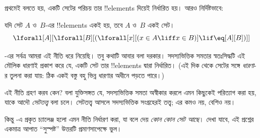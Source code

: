 \documentclass[../../../include/open-logic-section]{subfiles}
\begin{document}

প্রথমেই বলতে হয়, একটি সেটের পরিচয় তার !!{element}s দিয়েই
নির্ধারিত হয়। আরও নির্দিষ্টভাবে:

\begin{axiom}
যদি সেট $A$ ও~$B$-এর !!{element}s একই হয়, তবে $A$ ও~$B$
একই সেট।
\[
  \lforall[A][\lforall[B][(\lforall[x][(x \in A \liff x \in B)] \lif
  \eq[A][B])]]
\]
\end{axiom}

-এর সর্বত্র আমরা এই নীতি ধরে নিয়েছি। তবু
কথাটি আবার বলা দরকার। সদস্যভিত্তিক সমতার স্বতঃসিদ্ধটি এই মৌলিক
ধারণাই প্রকাশ করে যে, একটি সেট তার !!{element}s দ্বারা নির্ধারিত।
(এই দিক থেকে সেটের সঙ্গে \emph{ধারণা}-র তুলনা করা যায়: ঠিক একই
বস্তু বহু ভিন্ন ধারণার অধীনে পড়তে পারে।)

এই নীতি গ্রহণ করব কেন? বলা যুক্তিসঙ্গত যে, সদস্যভিত্তিক সমতা
অস্বীকার করলে এমন কিছুকেই পরিত্যাগ করা হয়, যাকে আদৌ
\emph{সেটতত্ত্ব} বলা চলে। সেটতত্ত্ব আসলে সদস্যভিত্তিক সংগ্রহেরই
তত্ত্ব; এর কমও নয়, বেশিও নয়।

কিন্তু -এ প্রকৃত চ্যালেঞ্জ হলো এমন নীতি
নির্ধারণ করা, যা বলে দেয় \emph{কোন কোন সেট আছে}। দেখা যাবে,
এই প্রশ্নের একমাত্র আপাত ``সুস্পষ্ট'' উত্তরটি প্রমাণসাপেক্ষে ভুল।
\end{document}
